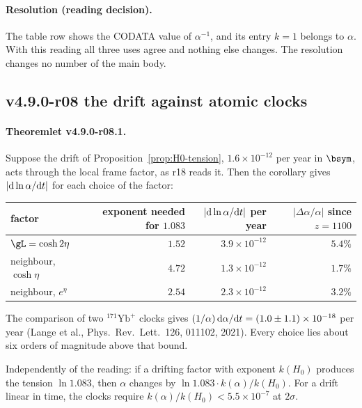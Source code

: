 \paragraph{Resolution (reading decision).}
The table row shows the CODATA value of \(\alpha^{-1}\), and its entry \(k=1\) belongs to \(\alpha\).  With this reading all
three uses agree and nothing else changes.  The resolution changes no number of the main body.

\subsection*{v4.9.0-r08 the drift against atomic clocks}
\label{subsec:v490-r08-clocks}

\paragraph{Theoremlet v4.9.0-r08.1.}
Suppose the drift of Proposition~\ref{prop:H0-tension}, \(1.6\times10^{-12}\) per year in \(\bsym\), acts through the local
frame factor, as r18 reads it.  Then the corollary gives \(|{\rm d}\ln\alpha/{\rm d}t|\) for each choice of the factor:

\begin{center}
\small
\begin{tabular}{@{}lrrr@{}}
\toprule
factor & exponent needed for \(1.083\) & \(|{\rm d}\ln\alpha/{\rm d}t|\) per year & \(|\Delta\alpha/\alpha|\) since \(z=1100\)\\
\midrule
\(\gL=\cosh2\eta\) & \(1.52\) & \(3.9\times10^{-12}\) & \(5.4\%\)\\
neighbour, \(\cosh\eta\) & \(4.72\) & \(1.3\times10^{-12}\) & \(1.7\%\)\\
neighbour, \(e^{\eta}\) & \(2.54\) & \(2.3\times10^{-12}\) & \(3.2\%\)\\
\bottomrule
\end{tabular}
\end{center}

The comparison of two \({}^{171}\mathrm{Yb}^+\) clocks gives \((1/\alpha)\,{\rm d}\alpha/{\rm d}t=(1.0\pm1.1)\times10^{-18}\)
per year (Lange et al., Phys.\ Rev.\ Lett.\ 126, 011102, 2021).  Every choice lies about six orders of magnitude above
that bound.

Independently of the reading: if a drifting factor with exponent \(k(H_0)\) produces the tension \(\ln1.083\), then
\(\alpha\) changes by \(\ln1.083\cdot k(\alpha)/k(H_0)\).  For a drift linear in time, the clocks require
\(k(\alpha)/k(H_0)<5.5\times10^{-7}\) at \(2\sigma\).

